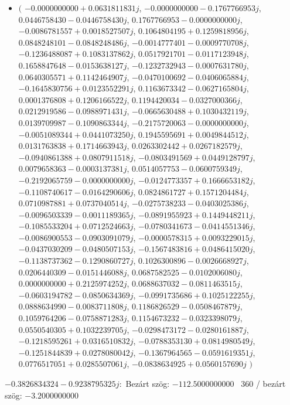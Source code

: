\documentclass[14pt,a4paper]{article}
\begin{document}
\begin{itemize}
\item
$\big($
$-0.0000000000+0.0631811831j$, $-0.0000000000-0.1767766953j$, $0.0446758430-0.0446758430j$, $0.1767766953-0.0000000000j$, $-0.0086781557+0.0018527507j$, $0.1064804195+0.1259818956j$, $0.0848248101-0.0848248486j$, $-0.0014777401-0.0009770708j$, $-0.1236488087+0.1083137862j$, $0.0517921701-0.0117123948j$, $0.1658847648-0.0153638127j$, $-0.1232732943-0.0007631780j$, $0.0640305571+0.1142464907j$, $-0.0470100692-0.0406065884j$, $-0.1645830756+0.0123552291j$, $0.1163673342-0.0627165804j$, $0.0001376808+0.1206166522j$, $0.1194420034-0.0327000366j$, $0.0212919586-0.0988971431j$, $-0.0665630488+0.1030432119j$, $0.0139709987-0.1090863344j$, $-0.2175720063-0.0000000000j$, $-0.0051089344+0.0441073250j$, $0.1945595691+0.0049844512j$, $0.0131763838+0.1714663943j$, $0.0263302442+0.0267182579j$, $-0.0940861388+0.0807911518j$, $-0.0803491569+0.0449128797j$, $0.0079658363-0.0003137381j$, $0.0514057753-0.0600759349j$, $-0.2192065759-0.0000000000j$, $-0.0124773357+0.1666653182j$, $-0.1108740617-0.0164290606j$, $0.0824861727+0.1571204484j$, $0.0710987881+0.0737040514j$, $-0.0275738233-0.0403025386j$, $-0.0096503339-0.0011189365j$, $-0.0891955923+0.1449448211j$, $-0.1085533204+0.0712524663j$, $-0.0780341673-0.0414551346j$, $-0.0086900553-0.0903091079j$, $-0.0000578315+0.0093229015j$, $-0.0437030209-0.0480507153j$, $-0.1567483816+0.0486415020j$, $-0.1138737362-0.1290860727j$, $0.1026300896-0.0026668927j$, $0.0206440309-0.0151446088j$, $0.0687582525-0.0102006080j$, $0.0000000000+0.2125974252j$, $0.0688637032-0.0811463515j$, $-0.0603194782-0.0850634369j$, $-0.0991735686+0.1025122255j$, $0.0888634990-0.0083711808j$, $0.1186826529-0.0508467879j$, $0.1059764206-0.0758871283j$, $0.1154673232-0.0323398079j$, $0.0550540305+0.1032239705j$, $-0.0298473172-0.0280161887j$, $-0.1218595261+0.0316510832j$, $-0.0788353130+0.0814980549j$, $-0.1251844839+0.0278080042j$, $-0.1367964565-0.0591619351j$, $0.0776517051+0.0285507061j$, $-0.0838634925+0.0560157690j$
$\big)$
\end{itemize}
$-0.3826834324-0.9238795325j$:\
Bezárt szög: $-112.5000000000$ \
360 / bezárt szög: $-3.2000000000$\
\end{document}
